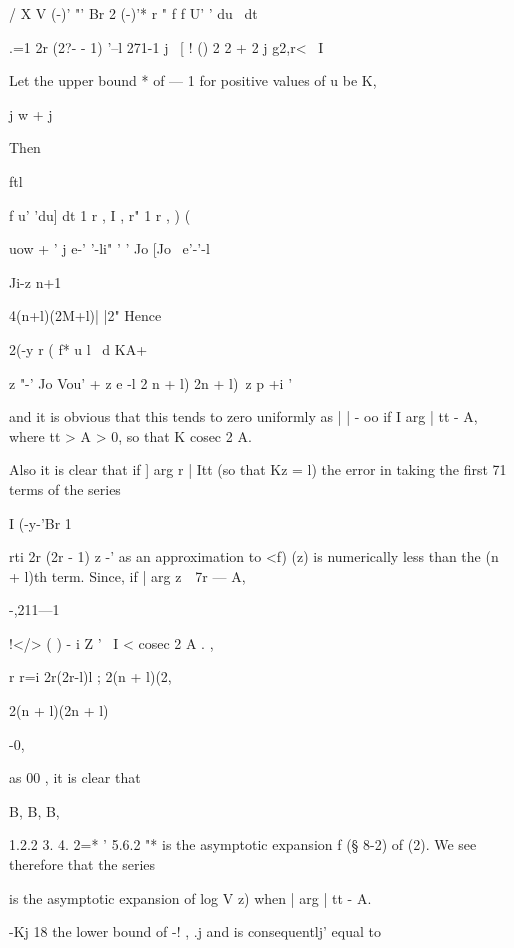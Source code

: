   / X V (-)' "' Br 2 (-)'* r " f f   U' ' du \ dt 



.=1 2r (2?- - 1)  '--l  271-1 j \  [ ! () 2 2 +  2 j g2,r< \  I 

Let the upper bound * of — 1 for positive values of u be K, 

j w  +   j   

Then 



ftl 



f u' 'du] dt 1 r  , I , r" 1 r    , ) (  



uow  +  ' j e-' '-li" ' ' Jo [Jo \ e'-'-l 

Ji-z  n+1 



 4(n+l)(2M+l)| |2" 
Hence 

2(-y  r ( f* u l \ d  KA+  

z "-' Jo Vou' + z  e   -l  2 n + l) 2n + l)\ z p +i ' 

and it is obvious that this tends to zero uniformly as |   |  - oo if I arg   |   tt - A, 
where  tt > A > 0, so that K  cosec 2 A. 

Also it is clear that if ] arg  r |   Itt (so that Kz = l) the error in taking the 
first 71 terms of the series 

I (-y-'Br 1 

rti 2r (2r - 1) z -' 
as an approximation to <f) (z) is numerically less than the (n + l)th term. 
Since, if | arg z\ \   7r — A, 



-,211—1 



!</> ( ) - i   Z ' \   I < cosec  2 A .  ,   

r r=i 2r(2r-l)l ; 2(n + l)(2, 



2(n + l)(2n + l) 

-0, 

as     00 , it is clear that 

B, B,   B, 



1.2.2 3. 4. 2=* ' 5.6.2  "* 
is the asymptotic expansion f (§ 8-2) of  (2). 
We see therefore that the series 

is the asymptotic expansion of log V  z) when | arg   |  tt - A. 

-Kj   18 the lower bound of -! ,   .j  and is consequentlj' equal to 

